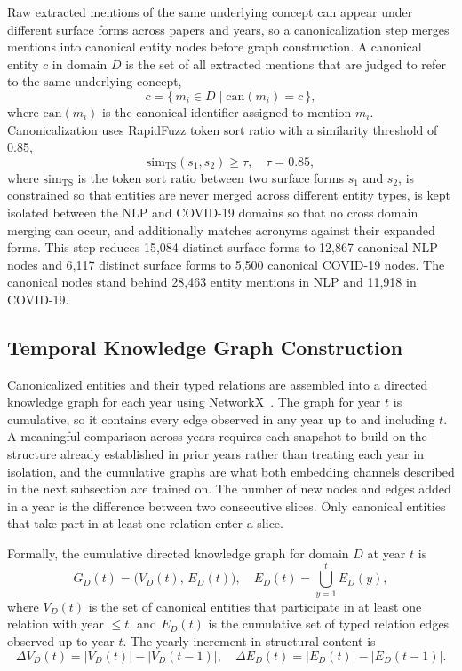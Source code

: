 \documentclass{ieeeaccess}
\begin{document}
Raw extracted mentions of the same underlying concept can appear under different surface forms across papers and years, so a canonicalization step merges mentions into canonical entity nodes before graph construction. A canonical entity $c$ in domain $D$ is the set of all extracted mentions that are judged to refer to the same underlying concept,
\begin{equation}
c = \{\, m_i \in D \mid \text{can}(m_i) = c \,\},
\label{eq:canonical}
\end{equation}
where $\text{can}(m_i)$ is the canonical identifier assigned to mention $m_i$. Canonicalization uses RapidFuzz token sort ratio with a similarity threshold of 0.85,
\begin{equation}
\text{sim}_{\text{TS}}(s_1, s_2) \geq \tau, \quad \tau = 0.85,
\label{eq:canon_threshold}
\end{equation}
where $\text{sim}_{\text{TS}}$ is the token sort ratio between two surface forms $s_1$ and $s_2$, is constrained so that entities are never merged across different entity types, is kept isolated between the NLP and COVID-19 domains so that no cross domain merging can occur, and additionally matches acronyms against their expanded forms. This step reduces 15,084 distinct surface forms to 12,867 canonical NLP nodes and 6,117 distinct surface forms to 5,500 canonical COVID-19 nodes. The canonical nodes stand behind 28,463 entity mentions in NLP and 11,918 in COVID-19.

\subsection{Temporal Knowledge Graph Construction}
\label{sec:kg}

Canonicalized entities and their typed relations are assembled into a directed knowledge graph for each year using NetworkX~\cite{hagberg2008exploring}. The graph for year $t$ is cumulative, so it contains every edge observed in any year up to and including $t$. A meaningful comparison across years requires each snapshot to build on the structure already established in prior years rather than treating each year in isolation, and the cumulative graphs are what both embedding channels described in the next subsection are trained on. The number of new nodes and edges added in a year is the difference between two consecutive slices. Only canonical entities that take part in at least one relation enter a slice.

Formally, the cumulative directed knowledge graph for domain $D$ at year $t$ is
\begin{equation}
G_D(t) = \big(V_D(t),\, E_D(t)\big), \quad
E_D(t) = \bigcup_{y=1}^{t} E_D(y),
\label{eq:cumulative_graph}
\end{equation}
where $V_D(t)$ is the set of canonical entities that participate in at least one relation with year $\leq t$, and $E_D(t)$ is the cumulative set of typed relation edges observed up to year $t$. The yearly increment in structural content is
\begin{equation}
\Delta V_D(t) = |V_D(t)| - |V_D(t-1)|, \quad
\Delta E_D(t) = |E_D(t)| - |E_D(t-1)|.
\label{eq:graph_delta}
\end{equation}
\end{document}

